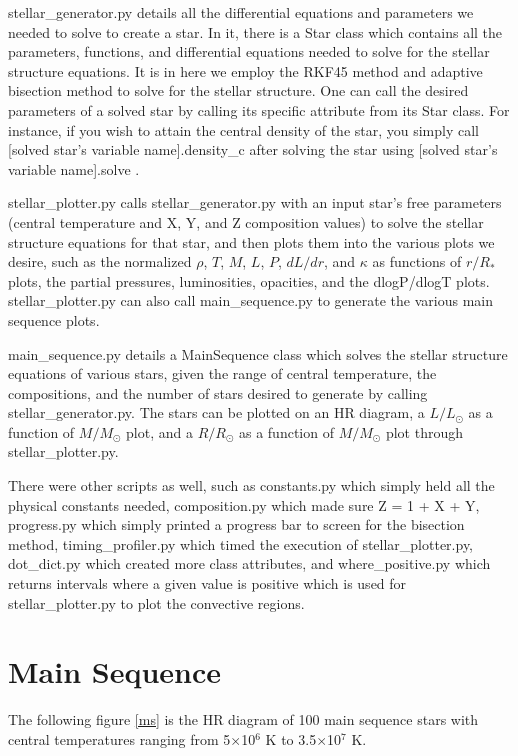 \documentclass[11pt]{article}
\begin{document}
stellar\_generator.py details all the differential equations and parameters we needed to solve to create a star. In it, there is a Star class which contains all the parameters, functions, and differential equations needed to solve for the stellar structure equations. It is in here we employ the RKF45 method and adaptive bisection method to solve for the stellar structure. One can call the desired parameters of a solved star by calling its specific attribute from its Star class. For instance, if you wish to attain the central density of the star, you simply call [solved star's variable name].density\_c after solving the star using [solved star's variable name].solve .

stellar\_plotter.py calls stellar\_generator.py with an input star's free parameters (central temperature and X, Y, and Z composition values) to solve the stellar structure equations for that star, and then plots them into the various plots we desire, such as the normalized $\rho$, $T$, $M$, $L$, $P$, $dL/dr$, and $\kappa$ as functions of $r/R_*$ plots, the partial pressures, luminosities, opacities, and the dlogP/dlogT plots. stellar\_plotter.py can also call main\_sequence.py to generate the various main sequence plots.

main\_sequence.py details a MainSequence class which solves the stellar structure equations of various stars, given the range of central temperature, the compositions, and the number of stars desired to generate by calling stellar\_generator.py. The stars can be plotted on an HR diagram, a $L/L_\odot$ as a function of $M/M_\odot$ plot, and a $R/R_\odot$ as a function of $M/M_\odot$ plot through stellar\_plotter.py. 

There were other scripts as well, such as constants.py which simply held all the physical constants needed, composition.py which made sure Z = 1 + X + Y, progress.py which simply printed a progress bar to screen for the bisection method, timing\_profiler.py which timed the execution of stellar\_plotter.py, dot\_dict.py which created more class attributes, and where\_positive.py which returns intervals where a given value is positive which is used for stellar\_plotter.py to plot the convective regions.

\newpage

\section{Main Sequence}
The following figure \ref{ms} is the HR diagram of 100 main sequence stars with central temperatures ranging from 5$\times$10$^6$ K to 3.5$\times$10$^7$ K.
\end{document}
